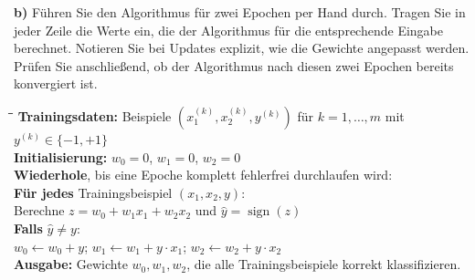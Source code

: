 \noindent \textbf{b)} Führen Sie den Algorithmus für zwei Epochen per Hand durch. Tragen Sie in jeder Zeile die Werte ein, die der Algorithmus für die entsprechende Eingabe berechnet. Notieren Sie bei Updates explizit, wie die Gewichte angepasst werden. Prüfen Sie anschließend, ob der Algorithmus nach diesen zwei Epochen bereits konvergiert ist.

\begin{tcolorbox}[title=Der Perzeptron-Lernalgorithmus (Pseudocode)]
\begin{tabbing}
\hspace{1.5em}\=\hspace{1.5em}\=\hspace{1.5em}\=\kill
\textbf{Trainingsdaten:} Beispiele $(x_1^{(k)}, x_2^{(k)}, y^{(k)})$ für $k = 1, \ldots, m$ mit $y^{(k)} \in \{-1, +1\}$\\[1mm]
\textbf{Initialisierung:} $w_0 = 0$, $w_1 = 0$, $w_2 = 0$\\[1mm]
\textbf{Wiederhole}, bis eine Epoche komplett fehlerfrei durchlaufen wird:\\[1mm]
\>\textbf{Für jedes} Trainingsbeispiel $(x_1, x_2, y)$:\\[1mm]
\>\>Berechne $z = w_0 + w_1 x_1 + w_2 x_2$ und $\hat{y} = \operatorname{sign}(z)$\\[1mm]
\>\>\textbf{Falls} $\hat{y} \neq y$: \quad {}\\[1mm]
\>\>\>$w_0 \leftarrow w_0 + y$; \quad $w_1 \leftarrow w_1 + y \cdot x_1$; \quad $w_2 \leftarrow w_2 + y \cdot x_2$\\[1mm]
\textbf{Ausgabe:} Gewichte $w_0, w_1, w_2$, die alle Trainingsbeispiele korrekt klassifizieren.
\end{tabbing}
\end{tcolorbox}
\medskip

